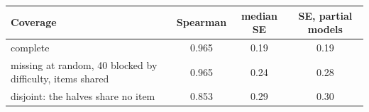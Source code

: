 \begin{tabular}{@{}lccc@{}}\toprule Coverage & Spearman & median SE & SE, partial models \\ \midrule
complete & 0.965 & 0.19 & 0.19 \\
missing at random, 40%
blocked by difficulty, items shared & 0.965 & 0.24 & 0.28 \\
disjoint: the halves share no item & 0.853 & 0.29 & 0.30 \\
\bottomrule\end{tabular}